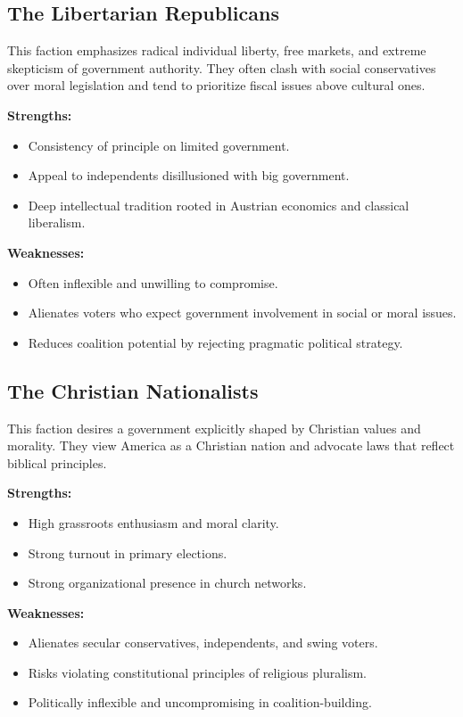 \subsection{The Libertarian Republicans}
This faction emphasizes radical individual liberty, free markets, and extreme skepticism of government authority. They often clash with social conservatives over moral legislation and tend to prioritize fiscal issues above cultural ones.

\textbf{Strengths:}
\begin{itemize}
\item Consistency of principle on limited government.
\item Appeal to independents disillusioned with big government.
\item Deep intellectual tradition rooted in Austrian economics and classical liberalism.
\end{itemize}

\textbf{Weaknesses:}
\begin{itemize}
\item Often inflexible and unwilling to compromise.
\item Alienates voters who expect government involvement in social or moral issues.
\item Reduces coalition potential by rejecting pragmatic political strategy.
\end{itemize}

\subsection{The Christian Nationalists}
This faction desires a government explicitly shaped by Christian values and morality. They view America as a Christian nation and advocate laws that reflect biblical principles.

\textbf{Strengths:}
\begin{itemize}
\item High grassroots enthusiasm and moral clarity.
\item Strong turnout in primary elections.
\item Strong organizational presence in church networks.
\end{itemize}

\textbf{Weaknesses:}
\begin{itemize}
\item Alienates secular conservatives, independents, and swing voters.
\item Risks violating constitutional principles of religious pluralism.
\item Politically inflexible and uncompromising in coalition-building.
\end{itemize}

